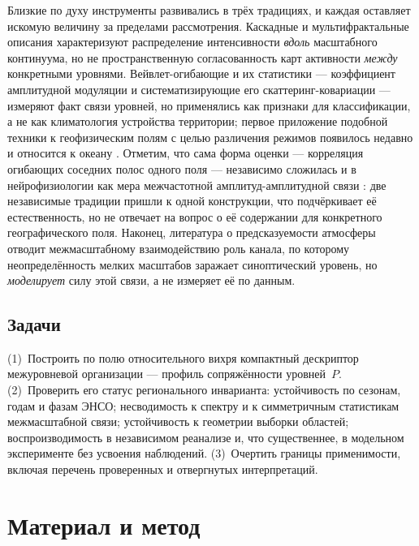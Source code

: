 \documentclass[11pt,a4paper]{article}
\begin{document}
Близкие по духу инструменты развивались в трёх традициях, и каждая оставляет искомую величину за пределами рассмотрения. Каскадные и мультифрактальные описания \cite{LovejoySchertzer2013,Lovejoy2011,Kouhen2024} характеризуют распределение интенсивности \emph{вдоль} масштабного континуума, но не пространственную согласованность карт активности \emph{между} конкретными уровнями. Вейвлет-огибающие и их статистики --- коэффициент амплитудной модуляции \cite{Farge1992,Mathis2009} и систематизирующие его скаттеринг-ковариации \cite{Mallat2012,BrunaMallat2013,Cheng2024} --- измеряют факт связи уровней, но применялись как признаки для классификации, а не как климатология устройства территории; первое приложение подобной техники к геофизическим полям с целью различения режимов появилось недавно и относится к океану \cite{Skinner2025}. Отметим, что сама форма оценки --- корреляция огибающих соседних полос одного поля --- независимо сложилась и в нейрофизиологии как мера межчастотной амплитуд-амплитудной связи \cite{Bruns2000,Canolty2006}: две независимые традиции пришли к одной конструкции, что подчёркивает её естественность, но не отвечает на вопрос о её содержании для конкретного географического поля. Наконец, литература о предсказуемости атмосферы \cite{Lorenz1969,Zhang2007,RotunnoSnyder2008,Judt2020,SelzCraig2023} отводит межмасштабному взаимодействию роль канала, по которому неопределённость мелких масштабов заражает синоптический уровень, но \emph{моделирует} силу этой связи, а не измеряет её по данным.

\subsection{Задачи}

(1)~Построить по полю относительного вихря компактный дескриптор межуровневой организации --- профиль сопряжённости уровней~$P$. (2)~Проверить его статус регионального инварианта: устойчивость по сезонам, годам и фазам ЭНСО; несводимость к спектру и к симметричным статистикам межмасштабной связи; устойчивость к геометрии выборки областей; воспроизводимость в независимом реанализе и, что существеннее, в модельном эксперименте без усвоения наблюдений. (3)~Очертить границы применимости, включая перечень проверенных и отвергнутых интерпретаций.

\section{Материал и метод}
\label{sec:data}
\end{document}
